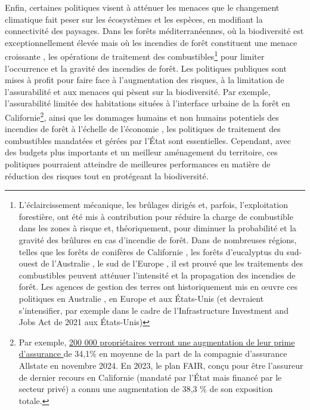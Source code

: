 Enfin, certaines politiques visent à atténuer les menaces que le changement climatique fait peser sur les écosystèmes et les espèces, en modifiant la connectivité des paysages. Dans les forêts méditerranéennes, où la biodiversité est exceptionnellement élevée mais où les incendies de forêt constituent une menace croissante \citep{Dupuy2019ClimateCI, wasserman_climate_2023}, les opérations de traitement des combustibles\footnote{ L'éclaircissement mécanique, les brûlages dirigés et, parfois, l'exploitation forestière, ont été mis à contribution pour réduire la charge de combustible dans les zones à risque et, théoriquement, pour diminuer la probabilité et la gravité des brûlures en cas d'incendie de forêt. Dans de nombreuses régions, telles que les forêts de conifères de Californie \citep{Vaillant2009, Kalies2016, low_shaded_2023}, les forêts d'eucalyptus du sud-ouest de l'Australie \citep{burrows2013, boer_long-term_2009, Florec2020}, le sud de l'Europe \citep{Fernandes2013}, il est prouvé que les traitements des combustibles peuvent atténuer l'intensité et la propagation des incendies de forêt.  Les agences de gestion des terres ont historiquement mis en œuvre ces politiques en Australie \citep{burrows2013}, en Europe et aux États-Unis (et devraient s'intensifier, par exemple dans le cadre de l'Infrastructure Investment and Jobs Act de 2021 aux États-Unis)} pour limiter l'occurrence et la gravité des incendies de forêt.  Les politiques publiques sont mises à profit pour faire face à l'augmentation des risques, à la limitation de l'assurabilité et aux menaces qui pèsent sur la biodiversité. Par exemple, l'assurabilité limitée des habitations situées à l'interface urbaine de la forêt en Californie\footnote{Par exemple, \href{https://www.washingtonpost.com/climate-environment/2024/08/29/california-insurance-wildfires-allstate/}{200 000 propriétaires verront une augmentation de leur prime d'assurance } de 34,1\% en moyenne de la part de la compagnie d'assurance Allstate en novembre 2024. En 2023, le plan FAIR, conçu pour être l'assureur de dernier recours en Californie (mandaté par l'État mais financé par le secteur privé) a connu une augmentation de 38,3 \% de son exposition totale.}, ainsi que les dommages humains et non humains potentiels des incendies de forêt à l'échelle de l'économie \citep{wang_economic_2021, heft-neal_behavior_2023, Ayars2023}, les politiques de traitement des combustibles mandatées et gérées par l'État sont essentielles. Cependant, avec des budgets plus importants et un meilleur aménagement du territoire, ces politiques pourraient atteindre de meilleures performances en matière de réduction des risques tout en protégeant la biodiversité.

